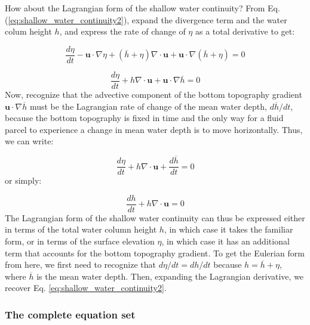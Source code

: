\documentclass[12pt]{article}
\numberwithin{equation}{section}
\numberwithin{figure}{section}
\numberwithin{table}{section}
\begin{document}
How about the Lagrangian form of the shallow water continuity?
From Eq. (\ref{eq:shallow_water_continuity2}), expand the divergence term and
the water colum height $h$, and express the rate of change of $\eta$ as a total
derivative to get:

\begin{equation}
  \frac{d\eta}{dt} - \mathbf{u} \cdot \nabla \eta + (\overline{h} + \eta) \nabla \cdot \mathbf{u} +
  \mathbf{u} \cdot \nabla (\overline{h} + \eta) = 0
  \label{eq:shallow_water_continuity3}
\end{equation}

\begin{equation}
  \frac{d\eta}{dt} + h \nabla \cdot \mathbf{u} +
  \mathbf{u} \cdot \nabla \overline{h} = 0
  \label{eq:shallow_water_continuity4}
\end{equation}
Now, recognize that the advective component of the bottom topography gradient
$\mathbf{u} \cdot \nabla \overline{h}$ must be the Lagrangian rate of change of
the mean water depth, $d\overline{h}/dt$, because the bottom topography is
fixed in time and the only way for a fluid parcel to experience a change in
mean water depth is to move horizontally.
Thus, we can write:

\begin{equation}
  \frac{d\eta}{dt} + h \nabla \cdot \mathbf{u} + \frac{d \overline{h}}{dt} = 0
  \label{eq:shallow_water_continuity5}
\end{equation}
or simply:

\begin{equation}
  \frac{dh}{dt} + h \nabla \cdot \mathbf{u} = 0
  \label{eq:shallow_water_continuity6}
\end{equation}
The Lagrangian form of the shallow water continuity can thus be expressed either
in terms of the total water column height $h$, in which case it takes the
familiar form, or in terms of the surface elevation $\eta$, in which case it
has an additional term that accounts for the bottom topography gradient.
To get the Eulerian form from here, we first need to recognize that
$d\eta/dt = dh/dt$ because $h = \overline{h} + \eta$, where $\overline{h}$ is the
mean water depth.
Then, expanding the Lagrangian derivative, we recover Eq.
\ref{eq:shallow_water_continuity2}.

\subsubsection{The complete equation set}
\end{document}
